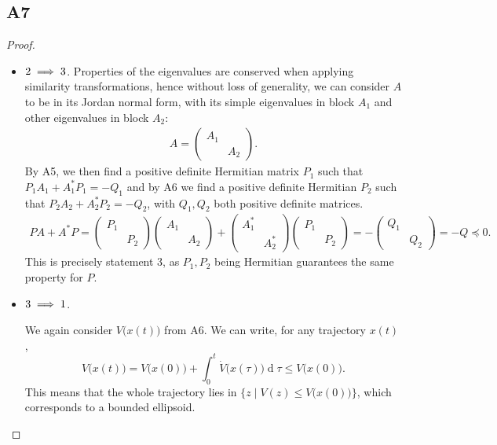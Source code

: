 \documentclass[11pt]{article}
\DeclareMathOperator{\newdiff}{d} %
\newcommand{\dif}{\newdiff\!}
\begin{document}
\subsection*{A7}
\begin{proof}\leavevmode
\begin{itemize}
	\item \(\textnormal{2} \implies \textnormal{3}\).
	Properties of the eigenvalues are conserved when applying similarity transformations, hence without loss of generality, we can consider \(A\) to be in its Jordan normal form, with its simple eigenvalues in block $A_1$ and other eigenvalues in block $A_2$:
	\begin{align*}
	A = \begin{pmatrix}
	A_1 & \\
	& A_2
	\end{pmatrix}.
	\end{align*}
	By A5, we then find a positive definite  Hermitian matrix $P_1$ such that $P_1A_1+A_1^*P_1=-Q_1$ and by A6 we find a positive definite Hermitian $P_2$ such that $P_2A_2+A_2^*P_2=-Q_2$, with \(Q_1, Q_2\) both positive definite matrices.
	\begin{align*}
	P A + A^* P = 
	\begin{pmatrix}
	P_1 & \\
	& P_2
	\end{pmatrix}
	\begin{pmatrix}
	A_1 & \\
	& A_2
	\end{pmatrix}
	+
	\begin{pmatrix}
	A_1^* & \\
	& A_2^*
	\end{pmatrix}
	\begin{pmatrix}
	P_1 & \\
	& P_2
	\end{pmatrix}=-
	\begin{pmatrix}
	Q_1 & \\
	& Q_2
	\end{pmatrix} = -Q \preceq 0.
	\end{align*}
	This is precisely statement 3, as \(P_1, P_2\) being Hermitian guarantees the same property for \(P\).
	\item \(\textnormal{3} \implies \textnormal{1}\).
	
	We again consider \(V\big(x(t)\big)\) from A6.
	We can write, for any trajectory \(x(t)\),
	\[
	V\big(x(t)\big) = V\big(x(0)\big) + \int_0^{t} \dot{V}\big(x(\tau)\big) \dif \tau \leqslant V\big(x(0)\big).
	\]
	This means that the whole trajectory lies in \(\Big\{z \mid V(z) \leqslant V\big(x(0)\big)\Big\}\), which corresponds to a bounded ellipsoid.\qedhere
\end{itemize}
\end{proof}
\end{document}
